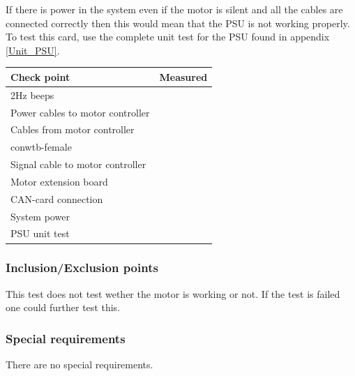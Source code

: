 If there is power in the system even if the motor is silent and all the cables are connected correctly then this would mean that the PSU is not working properly. To test this card, use the complete unit test for the PSU found in appendix \ref{Unit_PSU}.

\begin{tabular}{| l | c |}
\hline
Check point & Measured \\ \hline
2Hz beeps &  \\ \hline
Power cables to motor controller &  \\ \hline
Cables from motor controller & \\ \hline
conwtb-female & \\ \hline
Signal cable to motor controller & \\ \hline
Motor extension board & \\ \hline
CAN-card connection & \\ \hline
System power & \\ \hline
PSU unit test & \\ \hline
\end{tabular}
\subsubsection*{Inclusion/Exclusion points}
This test does not test wether the motor is working or not. If the test is failed one could further test this.  
\subsubsection*{Special requirements}
There are no special requirements. 